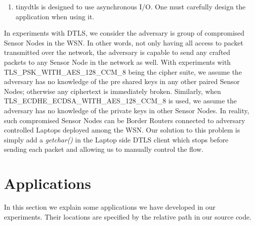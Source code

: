 \begin{enumerate}
\item tinydtls is designed to use asynchronous I/O. One must carefully design the application when using it.
\end{enumerate}

In experiments with DTLS, we consider the adversary is group of compromised Sensor Nodes in the WSN. In other words, not only having all access to packet transmitted over the network, the adversary is capable to send any crafted packets to any Sensor Node in the network as well. With experiments with TLS\_PSK\_WITH\_AES\_128\_CCM\_8 being the cipher suite, we assume the adversary has no knowledge of the pre shared keys in any other paired Sensor Nodes; otherwise any ciphertext is immediately broken. Similarly, when TLS\_ECDHE\_ECDSA\_WITH\_AES\_128\_CCM\_8 is used, we assume the adversary has no knowledge of the private keys in other Sensor Nodes. In reality, such compromised Sensor Nodes can be Border Routers connected to adversary controlled Laptops deployed among the WSN. Our solution to this problem is simply add a \textit{getchar()} in the Laptop side DTLS client which stops before sending each packet and allowing us to manually control the flow.

\section{Applications}

In this section we explain some applications we have developed in our experiments. Their locations are specified by the relative path in our source code.

